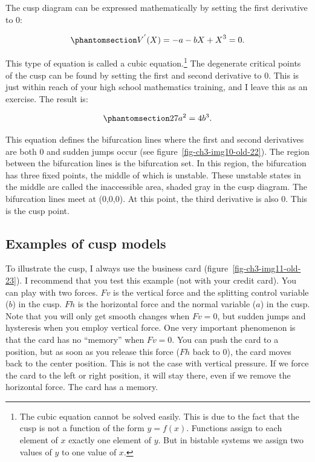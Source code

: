 \documentclass[
  a4paper,
  DIV=11,
  numbers=noendperiod,
  oneside]{scrreprt}
\begin{document}
The cusp diagram can be expressed mathematically by setting the first
derivative to 0:

\begin{equation}\phantomsection\label{eq-ch3-5-old-9}{
V^{'}(X) = {- a - bX + X}^{3} = 0.
}\end{equation}

This type of equation is called a cubic equation.\footnote{The cubic
  equation cannot be solved easily. This is due to the fact that the
  cusp is not a function of the form \(y = f(x)\). Functions assign to
  each element of \(x\) exactly one element of \(y\). But in bistable
  systems we assign two values of \(y\) to one value of \(x\).} The
degenerate critical points of the cusp can be found by setting the first
and second derivative to 0. This is just within reach of your high
school mathematics training, and I leave this as an exercise. The result
is:

\begin{equation}\phantomsection\label{eq-ch3-6-old-10}{
27a^{2} = 4b^{3}.
}\end{equation}

This equation defines the bifurcation lines where the first and second
derivatives are both 0 and sudden jumps occur (see
figure~\ref{fig-ch3-img10-old-22}). The region between the bifurcation
lines is the bifurcation set. In this region, the bifurcation has three
fixed points, the middle of which is unstable. These unstable states in
the middle are called the inaccessible area, shaded gray in the cusp
diagram. The bifurcation lines meet at (0,0,0). At this point, the third
derivative is also 0. This is the cusp point.

\subsection{Examples of cusp models}\label{sec-Examples-of-cusp-models}

To illustrate the cusp, I always use the business card
(figure~\ref{fig-ch3-img11-old-23}). I recommend that you test this
example (not with your credit card). You can play with two forces.
\(Fv\) is the vertical force and the splitting control variable (\(b\))
in the cusp. \(Fh\) is the horizontal force and the normal variable
(\(a\)) in the cusp. Note that you will only get smooth changes when
\(Fv = 0\), but sudden jumps and hysteresis when you employ vertical
force. One very important phenomenon is that the card has no ``memory''
when \(Fv = 0\). You can push the card to a position, but as soon as you
release this force (\(Fh\) back to 0), the card moves back to the center
position. This is not the case with vertical pressure. If we force the
card to the left or right position, it will stay there, even if we
remove the horizontal force. The card has a memory.
\end{document}

